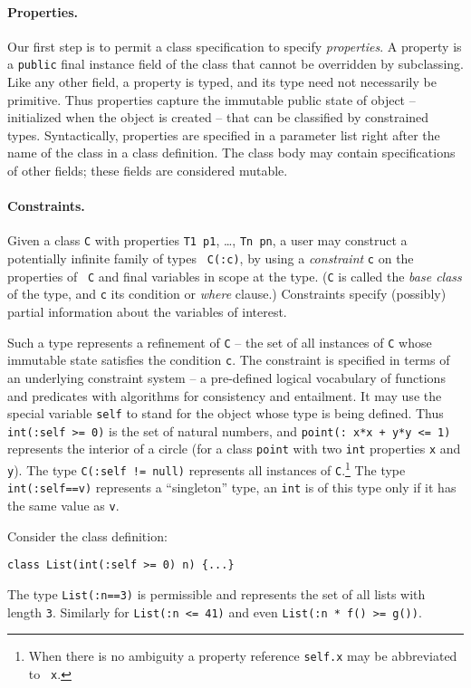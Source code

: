 \paragraph{Properties.}
Our first step is to permit a class specification to specify {\em
properties}. A property is a {\tt public} final instance field of the
class that cannot be overridden by subclassing. Like any other field,
a property is typed, and its type need not necessarily be
primitive. Thus properties capture the immutable public state of
object -- initialized when the object is created -- that can be
classified by constrained types. Syntactically, properties are
specified in a parameter list right after the name of the class in a
class definition. The class body may contain specifications of other
fields; these fields are considered mutable.

\paragraph{Constraints.}
Given a class {\tt C} with properties {\tt T1 p1}, \ldots, {\tt Tn
pn}, a user may construct a potentially infinite family of types {\tt
C(:c)}, by using a {\em constraint} {\tt c} on the properties of {\tt
C} and final variables in scope at the type. ({\tt C} is called the
{\em base class} of the type, and {\tt c} its condition or {\em where}
clause.)  Constraints specify (possibly) partial information about the
variables of interest. 

Such a type represents a refinement of {\tt C} -- the set of all
instances of {\tt C} whose immutable state satisfies the condition
{\tt c}.  The constraint is specified in terms of an underlying
constraint system \cite{CCCC} -- a pre-defined logical vocabulary of
functions and predicates with algorithms for consistency and
entailment.  It may use the special variable {\tt self} to stand for
the object whose type is being defined. Thus {\tt int(:self >= 0)} is
the set of natural numbers, and {\tt point(: x*x + y*y <= 1)}
represents the interior of a circle (for a class {\tt point} with two
{\tt int} properties {\tt x} and {\tt y}). The type {\tt C(:self !=
null)} represents all instances of {\tt C}.\footnote{When there is no
ambiguity a property reference {\tt self.x} may be abbreviated to {\tt
x}.} The type {\tt int(:self==v)} represents a ``singleton'' type, an
{\tt int} is of this type only if it has the same value as {\tt v}.

\begin{example}	
Consider the class definition:
{\footnotesize
\begin{verbatim}
class List(int(:self >= 0) n) {...}
\end{verbatim}}
The type {\tt List(:n==3)} is permissible and represents the set of
all lists with length {\tt 3}. Similarly for {\tt List(:n <= 41)}
and even {\tt List(:n * f() >= g())}.
\end{example}

